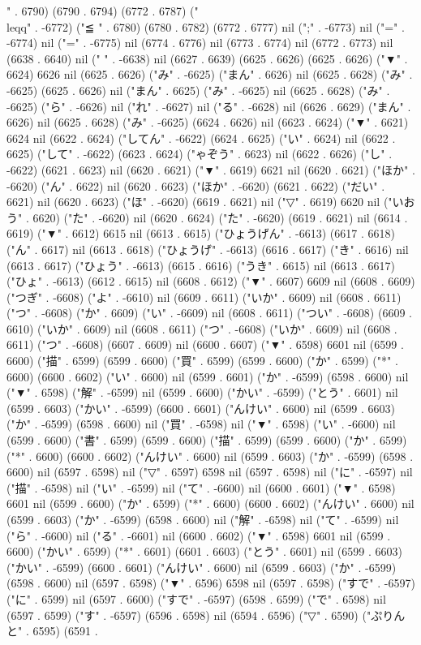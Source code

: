 " . 6790) (6790 . 6794) (6772 . 6787) ("\\leqq" . -6772) ("≦
" . 6780) (6780 . 6782) (6772 . 6777) nil (";" . -6773) nil ("=" . -6774) nil ("=" . -6775) nil (6774 . 6776) nil (6773 . 6774) nil (6772 . 6773) nil (6638 . 6640) nil (" " . -6638) nil (6627 . 6639) (6625 . 6626) (6625 . 6626) ("▼" . 6624) 6626 nil (6625 . 6626) ("み" . -6625) ("まん" . 6626) nil (6625 . 6628) ("み" . -6625) (6625 . 6626) nil ("まん" . 6625) ("み" . -6625) nil (6625 . 6628) ("み" . -6625) ("ら" . -6626) nil ("れ" . -6627) nil ("る" . -6628) nil (6626 . 6629) ("まん" . 6626) nil (6625 . 6628) ("み" . -6625) (6624 . 6626) nil (6623 . 6624) ("▼" . 6621) 6624 nil (6622 . 6624) ("してん" . -6622) (6624 . 6625) ("い" . 6624) nil (6622 . 6625) ("して" . -6622) (6623 . 6624) ("ゃぞう" . 6623) nil (6622 . 6626) ("し" . -6622) (6621 . 6623) nil (6620 . 6621) ("▼" . 6619) 6621 nil (6620 . 6621) ("ほか" . -6620) ("ん" . 6622) nil (6620 . 6623) ("ほか" . -6620) (6621 . 6622) ("だい" . 6621) nil (6620 . 6623) ("ほ" . -6620) (6619 . 6621) nil ("▽" . 6619) 6620 nil ("いおう" . 6620) ("た" . -6620) nil (6620 . 6624) ("た" . -6620) (6619 . 6621) nil (6614 . 6619) ("▼" . 6612) 6615 nil (6613 . 6615) ("ひょうげん" . -6613) (6617 . 6618) ("ん" . 6617) nil (6613 . 6618) ("ひょうげ" . -6613) (6616 . 6617) ("き" . 6616) nil (6613 . 6617) ("ひょう" . -6613) (6615 . 6616) ("うき" . 6615) nil (6613 . 6617) ("ひょ" . -6613) (6612 . 6615) nil (6608 . 6612) ("▼" . 6607) 6609 nil (6608 . 6609) ("つぎ" . -6608) ("よ" . -6610) nil (6609 . 6611) ("いか" . 6609) nil (6608 . 6611) ("つ" . -6608) ("か" . 6609) ("い" . -6609) nil (6608 . 6611) ("つい" . -6608) (6609 . 6610) ("いか" . 6609) nil (6608 . 6611) ("つ" . -6608) ("いか" . 6609) nil (6608 . 6611) ("つ" . -6608) (6607 . 6609) nil (6600 . 6607) ("▼" . 6598) 6601 nil (6599 . 6600) ("描" . 6599) (6599 . 6600) ("買" . 6599) (6599 . 6600) ("か" . 6599) ("*" . 6600) (6600 . 6602) ("い" . 6600) nil (6599 . 6601) ("か" . -6599) (6598 . 6600) nil ("▼" . 6598) ("解" . -6599) nil (6599 . 6600) ("かい" . -6599) ("とう" . 6601) nil (6599 . 6603) ("かい" . -6599) (6600 . 6601) ("んけい" . 6600) nil (6599 . 6603) ("か" . -6599) (6598 . 6600) nil ("買" . -6598) nil ("▼" . 6598) ("い" . -6600) nil (6599 . 6600) ("書" . 6599) (6599 . 6600) ("描" . 6599) (6599 . 6600) ("か" . 6599) ("*" . 6600) (6600 . 6602) ("んけい" . 6600) nil (6599 . 6603) ("か" . -6599) (6598 . 6600) nil (6597 . 6598) nil ("▽" . 6597) 6598 nil (6597 . 6598) nil ("に" . -6597) nil ("描" . -6598) nil ("い" . -6599) nil ("て" . -6600) nil (6600 . 6601) ("▼" . 6598) 6601 nil (6599 . 6600) ("か" . 6599) ("*" . 6600) (6600 . 6602) ("んけい" . 6600) nil (6599 . 6603) ("か" . -6599) (6598 . 6600) nil ("解" . -6598) nil ("て" . -6599) nil ("ら" . -6600) nil ("る" . -6601) nil (6600 . 6602) ("▼" . 6598) 6601 nil (6599 . 6600) ("かい" . 6599) ("*" . 6601) (6601 . 6603) ("とう" . 6601) nil (6599 . 6603) ("かい" . -6599) (6600 . 6601) ("んけい" . 6600) nil (6599 . 6603) ("か" . -6599) (6598 . 6600) nil (6597 . 6598) ("▼" . 6596) 6598 nil (6597 . 6598) ("すで" . -6597) ("に" . 6599) nil (6597 . 6600) ("すで" . -6597) (6598 . 6599) ("で" . 6598) nil (6597 . 6599) ("す" . -6597) (6596 . 6598) nil (6594 . 6596) ("▽" . 6590) ("ぷりんと" . 6595) (6591 . 